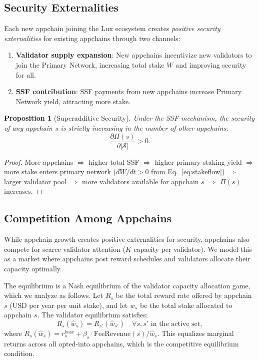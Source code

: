 \documentclass[11pt]{article}
\newtheorem{proposition}[theorem]{Proposition}
\begin{document}
\subsection{Security Externalities}

Each new appchain joining the Lux ecosystem creates \emph{positive security externalities}
for existing appchains through two channels:

\begin{enumerate}[leftmargin=1.5em]
  \item \textbf{Validator supply expansion}: New appchains incentivize new validators to
    join the Primary Network, increasing total stake $W$ and improving security for all.
  \item \textbf{SSF contribution}: SSF payments from new appchains increase Primary Network
    yield, attracting more stake.
\end{enumerate}

\begin{proposition}[Superadditive Security]
Under the SSF mechanism, the security of any appchain $s$ is strictly increasing in the
number of other appchains:
\[
  \frac{\partial \Pi(s)}{\partial |\mathcal{S}|} > 0.
\]
\end{proposition}

\begin{proof}
More appchains $\Rightarrow$ higher total SSF $\Rightarrow$ higher primary staking yield
$\Rightarrow$ more stake enters primary network ($dW/dt > 0$ from Eq.~\ref{eq:stakeflow})
$\Rightarrow$ larger validator pool $\Rightarrow$ more validators available for appchain $s$
$\Rightarrow$ $\Pi(s)$ increases.
\end{proof}

\subsection{Competition Among Appchains}

While appchain growth creates positive externalities for security, appchains also compete
for scarce validator attention ($K$ capacity per validator). We model this as a market
where appchains post reward schedules and validators allocate their capacity optimally.

The equilibrium is a Nash equilibrium of the validator capacity allocation game, which
we analyze as follows. Let $R_s$ be the total reward rate offered by appchain $s$ (USD per
year per unit stake), and let $\hat{w}_s$ be the total stake allocated to appchain $s$.
The validator equilibrium satisfies:
\[
  R_s(\hat{w}_s) = R_{s'}(\hat{w}_{s'}) \quad \forall s, s' \text{ in the active set},
\]
where $R_s(\hat{w}_s) = r_s^{\text{base}} + \beta_s \cdot \text{FeeRevenue}(s) / \hat{w}_s$.
This equalizes marginal returns across all opted-into appchains, which is the competitive
equilibrium condition.
\end{document}
